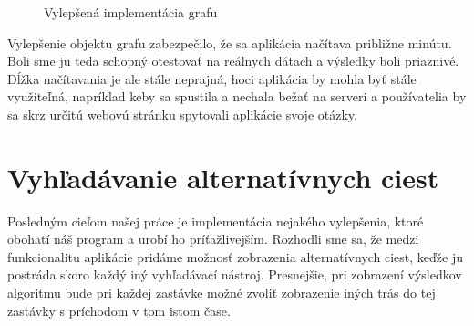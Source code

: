 \begin{figure}[H]
  \caption{Vylepšená implementácia grafu}
  \label{4_Graph}
\end{figure}

Vylepšenie objektu grafu zabezpečilo, že sa aplikácia načítava približne minútu. Boli sme ju teda schopný otestovať na reálnych dátach a výsledky boli priaznivé. Dĺžka načítavania je ale stále neprajná, hoci aplikácia by mohla byť stále využiteľná, napríklad keby sa spustila a nechala bežať na serveri a používatelia by sa skrz určitú webovú stránku spytovali aplikácie svoje otázky.\newline


\section{Vyhľadávanie alternatívnych ciest}

Posledným cieľom našej práce je implementácia nejakého vylepšenia, ktoré obohatí náš program a urobí ho príťažlivejším. Rozhodli sme sa, že medzi funkcionalitu aplikácie pridáme možnosť zobrazenia alternatívnych ciest, keďže ju postráda skoro každý iný vyhľadávací nástroj. Presnejšie, pri zobrazení výsledkov algoritmu bude pri každej zastávke možné zvoliť zobrazenie iných trás do tej zastávky s príchodom v tom istom čase.\newline 

